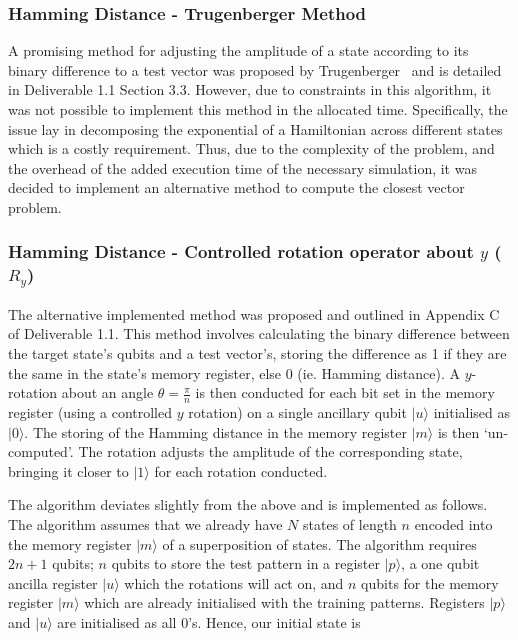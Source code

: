 \subsubsection{Hamming Distance - Trugenberger Method}
\label{sec:hamming_distance_trugenberger_method}
A promising method for adjusting the amplitude of a state according to its binary difference to a test vector was proposed by Trugenberger~\cite{Trugenberger_2001, Trugenberger_2002} and is detailed in Deliverable 1.1 Section 3.3. However, due to constraints in this algorithm, it was not possible to implement this method in the allocated time. Specifically, the issue lay in decomposing the exponential of a Hamiltonian across different states which is a costly requirement. Thus, due to the complexity of the problem, and the overhead of the added execution time of the necessary simulation, it was decided to implement an alternative method to compute the closest vector problem.

\subsubsection{Hamming Distance - Controlled rotation operator about $\hat{y}$ (\textrm{$R_y$}) }
\label{sec:hamming_distance_cry_rotation}

The alternative implemented method was proposed and outlined in Appendix C of Deliverable 1.1. This method involves calculating the binary difference between the target state's qubits and a test vector's, storing the difference as 1 if they are the same in the state's memory register, else 0 (ie. Hamming distance). A $y$-rotation about an angle $\theta = \frac{\pi}{n}$ is then conducted for each bit set in the memory register (using a controlled $y$ rotation) on a single ancillary qubit $\vert u \rangle$ initialised as $\vert 0 \rangle$. The storing of the Hamming distance in the memory register $\vert m \rangle$ is then `un-computed'. The rotation adjusts the amplitude of the corresponding state, bringing it closer to $\vert 1 \rangle$ for each rotation conducted.

The algorithm deviates slightly from the above and is implemented as follows. The algorithm assumes that we already have $N$ states of length $n$ encoded into the memory register $\vert m \rangle$ of a superposition of states. The algorithm requires $2n+1$ qubits; $n$ qubits to store the test pattern in a register $\vert p \rangle$, a one qubit ancilla register $\vert u \rangle$ which the rotations will act on, and $n$ qubits for the memory register $\vert m \rangle$ which are already initialised with the training patterns. Registers $\vert p \rangle$ and $\vert u \rangle$ are initialised as all $0$'s. Hence, our initial state is

